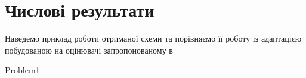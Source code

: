 
\section{Числові результати}

Наведемо приклад роботи отриманої схеми та порівняємо
	її роботу із адаптацією побудованою на оцінювачі запропонованому в \cite{OstShynAee11}

{Problem1}
